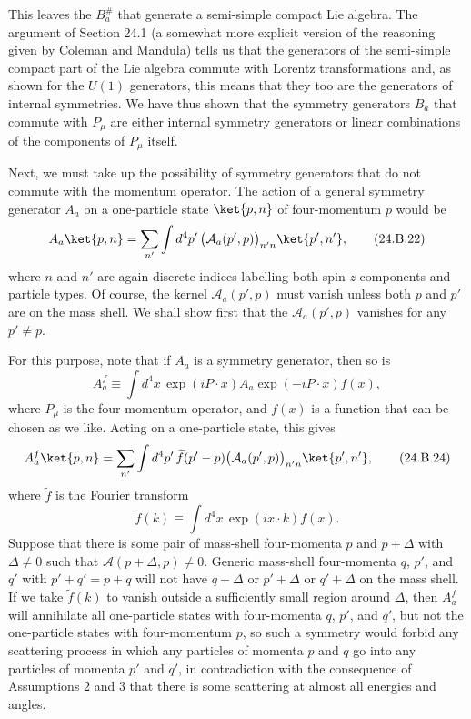 This leaves the $B_a^\#$ that generate a semi-simple compact Lie algebra.
The argument of Section 24.1 (a somewhat more explicit version of the
reasoning given by Coleman and Mandula) tells us that the generators of the
semi-simple compact part of the Lie algebra commute with Lorentz
transformations and, as shown for the $U(1)$ generators, this means that they
too are the generators of internal symmetries. We have thus shown that the
symmetry generators $B_a$ that commute with $P_\mu$ are either internal
symmetry generators or linear combinations of the components of $P_\mu$
itself.

Next, we must take up the possibility of symmetry generators that do not
commute with the momentum operator. The action of a general symmetry generator
$A_a$ on a one-particle state $\ket{p,n}$ of four-momentum $p$ would be
\begin{equation}
 A_a\ket{p,n}
 =\sum_{n'}\int d^4p'\,
 \bigl(\mathcal{A}_a(p',p)\bigr)_{n'n}\ket{p',n'},
\tag{24.B.22}\label{eq:24.B.22}
\end{equation}
where $n$ and $n'$ are again discrete indices labelling both spin
$z$-components and particle types. Of course, the kernel
$\mathcal{A}_a(p',p)$ must vanish unless both $p$ and $p'$ are on the
mass shell. We shall show first that the $\mathcal{A}_a(p',p)$ vanishes
for any $p'\ne p$.

For this purpose, note that if $A_a$ is a symmetry generator, then so is
\begin{equation}
 A_a^f\equiv\int d^4x\,
 \exp(iP\cdot x)A_a\exp(-iP\cdot x)f(x),
\tag{24.B.23}\label{eq:24.B.23}
\end{equation}
where $P_\mu$ is the four-momentum operator, and $f(x)$ is a function that can
be chosen as we like. Acting on a one-particle state, this gives
\begin{equation}
 A_a^f\ket{p,n}
 =\sum_{n'}\int d^4p'\,\widetilde f(p'-p)
 \bigl(\mathcal{A}_a(p',p)\bigr)_{n'n}\ket{p',n'},
\tag{24.B.24}\label{eq:24.B.24}
\end{equation}
where $\widetilde f$ is the Fourier transform
\begin{equation}
 \widetilde f(k)\equiv\int d^4x\,\exp(ix\cdot k)f(x).
\tag{24.B.25}\label{eq:24.B.25}
\end{equation}
Suppose that there is some pair of mass-shell four-momenta $p$ and $p+\Delta$
with $\Delta\ne0$ such that $\mathcal{A}(p+\Delta,p)\ne0$. Generic mass-shell
four-momenta $q$, $p'$, and $q'$ with $p'+q'=p+q$ will not have $q+\Delta$ or
$p'+\Delta$ or $q'+\Delta$ on the mass shell. If we take $\widetilde f(k)$ to
vanish outside a sufficiently small region around $\Delta$, then $A_a^f$
will annihilate all one-particle states with four-momenta $q$, $p'$, and $q'$,
but not the one-particle states with four-momentum $p$, so such a symmetry
would forbid any scattering process in which any particles of momenta $p$ and
$q$ go into any particles of momenta $p'$ and $q'$, in contradiction with the
consequence of Assumptions 2 and 3 that there is some scattering at almost all
energies and angles.

